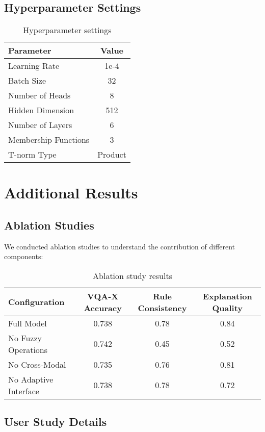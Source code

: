 \documentclass[manuscript,review,anonymous]{acmart}
\begin{document}
\subsection{Hyperparameter Settings}

\begin{table}[h]
\centering
\begin{tabular}{|l|c|}
\hline
Parameter & Value \\
\hline
Learning Rate & 1e-4 \\
Batch Size & 32 \\
Number of Heads & 8 \\
Hidden Dimension & 512 \\
Number of Layers & 6 \\
Membership Functions & 3 \\
T-norm Type & Product \\
\hline
\end{tabular}
\caption{Hyperparameter settings}
\label{tab:hyperparameters}
\end{table}

\section{Additional Results}

\subsection{Ablation Studies}

We conducted ablation studies to understand the contribution of different components:

\begin{table}[h]
\centering
\begin{tabular}{|l|c|c|c|}
\hline
Configuration & VQA-X Accuracy & Rule Consistency & Explanation Quality \\
\hline
Full Model & 0.738 & 0.78 & 0.84 \\
No Fuzzy Operations & 0.742 & 0.45 & 0.52 \\
No Cross-Modal & 0.735 & 0.76 & 0.81 \\
No Adaptive Interface & 0.738 & 0.78 & 0.72 \\
\hline
\end{tabular}
\caption{Ablation study results}
\label{tab:ablation}
\end{table}

\subsection{User Study Details}
\end{document}
